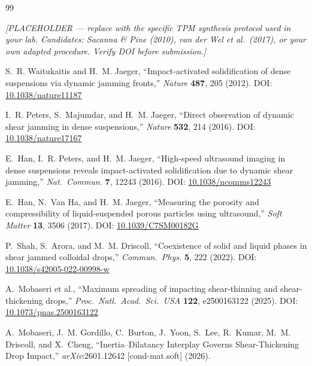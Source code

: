 \documentclass[11pt,letterpaper]{article}
\begin{document}
\begin{thebibliography}{99}

  \textit{[PLACEHOLDER --- replace with the specific TPM synthesis protocol
  used in your lab. Candidates: Sacanna \& Pine (2010), van der Wel et al.\
  (2017), or your own adapted procedure. Verify DOI before submission.]}

  S.~R. Waitukaitis and H.~M. Jaeger,
  ``Impact-activated solidification of dense suspensions via dynamic jamming fronts,''
  \textit{Nature} \textbf{487}, 205 (2012).
  DOI: \href{https://doi.org/10.1038/nature11187}{10.1038/nature11187}

  I.~R. Peters, S.~Majumdar, and H.~M. Jaeger,
  ``Direct observation of dynamic shear jamming in dense suspensions,''
  \textit{Nature} \textbf{532}, 214 (2016).
  DOI: \href{https://doi.org/10.1038/nature17167}{10.1038/nature17167}

  E.~Han, I.~R. Peters, and H.~M. Jaeger,
  ``High-speed ultrasound imaging in dense suspensions reveals
  impact-activated solidification due to dynamic shear jamming,''
  \textit{Nat.\ Commun.} \textbf{7}, 12243 (2016).
  DOI: \href{https://doi.org/10.1038/ncomms12243}{10.1038/ncomms12243}

  E.~Han, N.~Van Ha, and H.~M. Jaeger,
  ``Measuring the porosity and compressibility of liquid-suspended porous
  particles using ultrasound,''
  \textit{Soft Matter} \textbf{13}, 3506 (2017).
  DOI: \href{https://doi.org/10.1039/C7SM00182G}{10.1039/C7SM00182G}

  P.~Shah, S.~Arora, and M.~M. Driscoll,
  ``Coexistence of solid and liquid phases in shear jammed colloidal drops,''
  \textit{Commun.\ Phys.} \textbf{5}, 222 (2022).
  DOI: \href{https://doi.org/10.1038/s42005-022-00998-w}{10.1038/s42005-022-00998-w}

  A.~Mobaseri et al.,
  ``Maximum spreading of impacting shear-thinning and shear-thickening drops,''
  \textit{Proc.\ Natl.\ Acad.\ Sci.\ USA} \textbf{122}, e2500163122 (2025).
  DOI: \href{https://doi.org/10.1073/pnas.2500163122}{10.1073/pnas.2500163122}

  A.~Mobaseri, J.~M. Gordillo, C.~Burton, J.~Yoon, S.~Lee, R.~Kumar,
  M.~M. Driscoll, and X.~Cheng,
  ``Inertia--Dilatancy Interplay Governs Shear-Thickening Drop Impact,''
  \textit{arXiv}:2601.12642 [cond-mat.soft] (2026).


\end{thebibliography}
\end{document}
